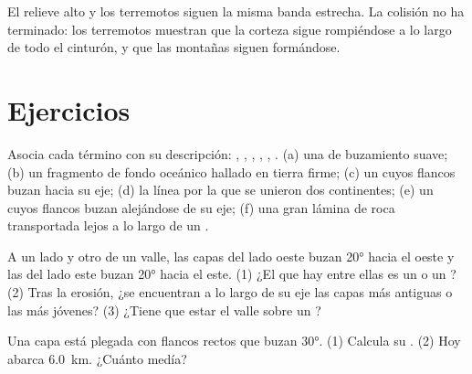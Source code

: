 El relieve alto y los terremotos siguen la misma banda estrecha. La colisión
no ha terminado: los terremotos muestran que la corteza sigue rompiéndose a lo
largo de todo el cinturón, y que las montañas siguen formándose.

\section{Ejercicios}

\begin{exercise}[$\star$]\label{exo:g12:mountain-building:1}
Asocia cada término con su descripción: , ,
, , , . (a) una 
de buzamiento suave; (b) un fragmento de fondo oceánico hallado en tierra
firme; (c) un  cuyos flancos buzan hacia su eje; (d) la línea por la
que se unieron dos continentes; (e) un  cuyos flancos buzan alejándose
de su eje; (f) una gran lámina de roca transportada lejos a lo largo de un
.
\end{exercise}

\begin{exercise}[$\star$]\label{exo:g12:mountain-building:2}
A un lado y otro de un valle, las capas del lado oeste buzan \ang{20} hacia
el oeste y las del lado este buzan \ang{20} hacia el este. (1) ¿El 
que hay entre ellas es un  o un ? (2) Tras la erosión, ¿se
encuentran a lo largo de su eje las capas más antiguas o las más jóvenes?
(3) ¿Tiene que estar el valle sobre un ?
\end{exercise}

\begin{exercise}[$\star$]\label{exo:g12:mountain-building:3}
Una capa está plegada con flancos rectos que buzan \ang{30}. (1) Calcula su
. (2) Hoy abarca \qty{6.0}{km}. ¿Cuánto medía?
\end{exercise}

